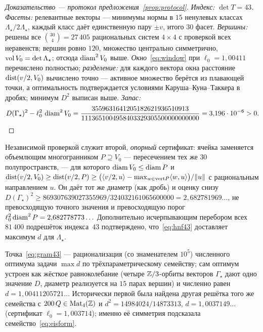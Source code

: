 \begin{proof}[Доказательство --- протокол предложения~\ref{prop:protocol}]
\emph{Индекс:} $\det T=43$. \emph{Фасеты:} релевантные векторы --- минимумы
нормы в $15$ ненулевых классах $\Lambda_\star/2\Lambda_\star$, каждый класс
даёт единственную пару $\pm v$, итого $30$ фасет. \emph{Вершины:} решены все
$\binom{30}{4}=27\,405$ рациональных систем $4\times4$ с проверкой всех
неравенств; вершин ровно $120$, множество центрально симметрично,
$\operatorname{vol} V_0=\det\Lambda_\star$; отсюда $\operatorname{diam}^2V_0$ выше.
\emph{Окно}~\eqref{eq:window} при $\ell_0=1{,}00411$ перечислено полностью;
\emph{разделение:} для каждого вектора окна расстояние $\operatorname{dist}(v/2,V_0)$
вычислено точно --- активное множество берётся из плавающей точки, а
оптимальность подтверждается условиями Каруша--Куна--Таккера в дробях;
минимум $D^2$ выписан выше. \emph{Запас:}
\[
D(\Gamma_\star)^2-\ell_0^2\,\operatorname{diam}^2V_0
=\frac{3559631641205182621936510913}{1113651004958403329305500000000000}
=3{,}196\cdot10^{-6}>0 .
\qedhere
\]
\end{proof}

Независимой проверкой служит второй, \emph{опорный} сертификат: ячейка
заменяется объемлющим многогранником $P\supseteq V_0$ --- пересечением тех же
$30$ полупространств, --- для которого $\operatorname{diam} V_0\le\operatorname{diam} P$ и
$\operatorname{dist}(v/2,V_0)\ge\operatorname{dist}(v/2,P)\ge\bigl(\langle v/2,u\rangle-\max_{w\in
\mathrm{vert}P}\langle w,u\rangle\bigr)/\|u\|$ с рациональным направлением
$u$. Он даёт тот же диаметр (как дробь) и оценку снизу
$D(\Gamma_\star)^2\ge869307639027355969/324032161065600000=2{,}682781969\ldots$,
не превосходящую точного значения и превосходящую порог
$\ell_0^2\operatorname{diam}^2P=2{,}682778773\ldots$ Дополнительно исчерпывающим перебором
всех $81\,400$ подрешёток индекса~$43$ подтверждено, что~\eqref{eq:hnf43}
доставляет максимум $d$ для $\Lambda_\star$.

\begin{remark}
Точка~\eqref{eq:gram43} --- рационализация (со знаменателем $10^5$) численного
оптимума задачи $\max d$ по трёхпараметрическому семейству; сам оптимум
устроен как жёсткое равноколебание (четыре $\mathbb{Z}/3$-орбиты векторов
$\Gamma_\star$ дают одно значение $D$, диаметр реализуется на $15$ парах
вершин) и численно равен $d=1{,}00411205721\ldots$ Исторически первой была
найдена другая решётка того же семейства с $200\,Q\in\mathrm{Mat}_4(\mathbb{Z})$ и
$d^2=14984024/14873313$, $d=1{,}0037149\ldots$
(сертификат $\ell_0=1{,}003714$); именно её симметрия подсказала
семейство~\eqref{eq:eisform}.
\end{remark}

